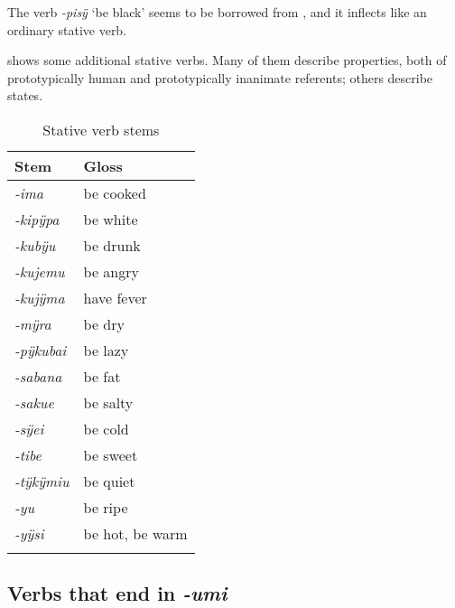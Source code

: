 The verb \textit{-pisÿ} ‘be black’ seems to be borrowed from , and it inflects like an ordinary stative verb.

 shows some additional stative verbs. Many of them describe properties, both of prototypically human and prototypically inanimate referents; others describe states.

\begin{table}
\caption[Stative verb stems]{Stative verb stems}

\begin{tabular}{ll}
\lsptoprule
Stem & Gloss \\
\midrule
\textit{-ima} & be cooked \\
\textit{-kipÿpa} & be white\\
\textit{-kubÿu} & be drunk \\
\textit{-kujemu} & be angry \\
\textit{-kujÿma} & have fever \\
\textit{-mÿra} & be dry \\
\textit{-pÿkubai} & be lazy\\
\textit{-sabana} & be fat\\
\textit{-sakue} & be salty \\
\textit{-sÿei} & be cold \\
\textit{-tibe} & be sweet\\
\textit{-tÿkÿmiu} & be quiet \\
\textit{-yu} & be ripe \\
\textit{-yÿsi} & be hot, be warm\\
\lspbottomrule
\end{tabular}

\label{table:stat-simple}
\end{table}

%
%
%

\subsection{Verbs that end in \textit{-umi}}\label{sec:StativeVerbs-mi}

